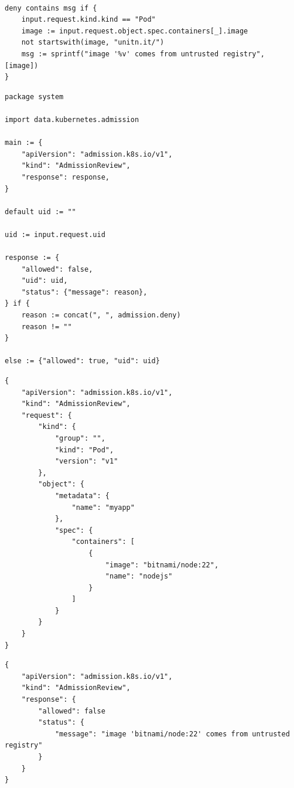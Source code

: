 \begin{lstlisting}[language=Rego, caption={Rego policy for Pods registry},
label=lst:rego_data_mapping]
                                          
deny contains msg if {                                                      
    input.request.kind.kind == "Pod"                                        
    image := input.request.object.spec.containers[_].image                  
    not startswith(image, "unitn.it/")                                     
    msg := sprintf("image '%v' comes from untrusted registry", [image])     
}
\end{lstlisting}

\begin{lstlisting}[caption={Rego ``root" policy (system.main)}]
package system

import data.kubernetes.admission

main := {
	"apiVersion": "admission.k8s.io/v1",
	"kind": "AdmissionReview",
	"response": response,
}

default uid := ""

uid := input.request.uid

response := {
	"allowed": false,
	"uid": uid,
	"status": {"message": reason},
} if {
	reason := concat(", ", admission.deny)
	reason != ""
}

else := {"allowed": true, "uid": uid}
\end{lstlisting}


\newpage
\lstset{style=jsonstyle}
\begin{lstlisting}[caption={AdmissionReview request}]
{
    "apiVersion": "admission.k8s.io/v1",
    "kind": "AdmissionReview",
    "request": {
        "kind": {
            "group": "",
            "kind": "Pod",
            "version": "v1"
        },
        "object": {
            "metadata": {
                "name": "myapp"
            },
            "spec": {
                "containers": [
                    {
                        "image": "bitnami/node:22",
                        "name": "nodejs"
                    }
                ]
            }
        }
    }
}
\end{lstlisting}


\lstset{style=jsonstyle}
\begin{lstlisting}[caption={AdmissionReview response}]
{
    "apiVersion": "admission.k8s.io/v1",
    "kind": "AdmissionReview",
    "response": {
        "allowed": false
        "status": {
            "message": "image 'bitnami/node:22' comes from untrusted registry"
        }
    }
}
\end{lstlisting}

